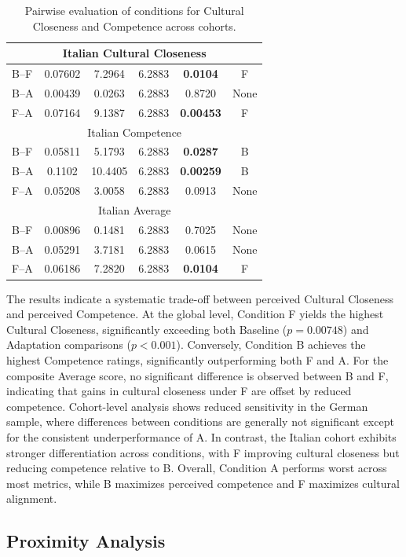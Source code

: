 \begin{table}[!ht]
\begin{tabular}{lccccc}
\midrule
\multicolumn{6}{c}{Italian Cultural Closeness} \\
\midrule
B--F & 0.07602 & 7.2964 & 6.2883 & \textbf{0.0104} & F \\
B--A & 0.00439 & 0.0263 & 6.2883 & 0.8720 & None \\
F--A & 0.07164 & 9.1387 & 6.2883 & \textbf{0.00453} & F \\
\midrule
\multicolumn{6}{c}{Italian Competence} \\
\midrule
B--F & 0.05811 & 5.1793 & 6.2883 & \textbf{0.0287} & B \\
B--A & 0.1102 & 10.4405 & 6.2883 & \textbf{0.00259} & B \\
F--A & 0.05208 & 3.0058 & 6.2883 & 0.0913 & None \\
\midrule
\multicolumn{6}{c}{Italian Average} \\
\midrule
B--F & 0.00896 & 0.1481 & 6.2883 & 0.7025 & None \\
B--A & 0.05291 & 3.7181 & 6.2883 & 0.0615 & None \\
F--A & 0.06186 & 7.2820 & 6.2883 & \textbf{0.0104} & F \\
\bottomrule
\end{tabular}
\caption{Pairwise evaluation of conditions for Cultural Closeness and Competence across cohorts.}
\label{tab:significance_stats}
\end{table}
The results indicate a systematic trade-off between perceived Cultural Closeness and perceived Competence. 
At the global level, Condition F yields the highest Cultural Closeness, significantly exceeding both Baseline ($p = 0.00748$) and Adaptation comparisons ($p < 0.001$). Conversely, Condition B achieves the highest Competence ratings, significantly outperforming both F and A. For the composite Average score, no significant difference is observed between B and F, indicating that gains in cultural closeness under F are offset by reduced competence. Cohort-level analysis shows reduced sensitivity in the German sample, where differences between conditions are generally not significant except for the consistent underperformance of A. In contrast, the Italian cohort exhibits stronger differentiation across conditions, with F improving cultural closeness but reducing competence relative to B. Overall, Condition A performs worst across most metrics, while B maximizes perceived competence and F maximizes cultural alignment.

\subsection{Proximity Analysis}

